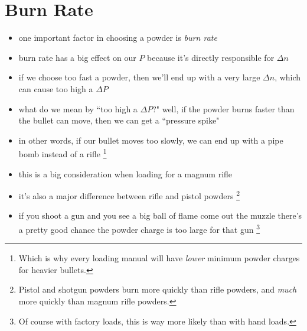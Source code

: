 \documentclass[11pt, oneside]{article}   	%
\begin{document}
\section{Burn Rate}
\begin{itemize}
\item one important factor in choosing a powder is \emph{burn rate}
\item burn rate has a big effect on our $P$ because it's directly responsible for $\Delta n$
\item if we choose too fast a powder, then we'll end up with a very large $\Delta n$, which can cause too high a $\Delta P$
\item what do we mean by ``too high a $\Delta P$?" well, if the powder burns faster than the bullet can move, then we can get a ``pressure spike"
\item in other words, if our bullet moves too slowly, we can end up with a pipe bomb instead of a rifle
\footnote{Which is why every loading manual will have \emph{lower} minimum powder charges for heavier bullets.}
\item this is a big consideration when loading for a magnum rifle
\item it's also a major difference between rifle and pistol powders
\footnote{Pistol and shotgun powders burn more quickly than rifle powders, and \emph{much} more quickly than magnum rifle powders.}
\item if you shoot a gun and you see a big ball of flame come out the muzzle there's a pretty good chance the powder charge is too large for that gun
\footnote{Of course with factory loads, this is way more likely than with hand loads.}
\end{itemize}
\end{document}
